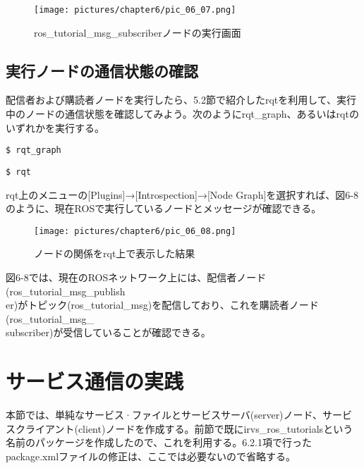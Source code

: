 \begin{figure}[h]
  \centering
  \texttt{[image: pictures/chapter6/pic\_06\_07.png]}
  \caption{ros\_tutorial\_msg\_subscriberノードの実行画面}
\end{figure}


\subsection{実行ノードの通信状態の確認}

配信者および購読者ノードを実行したら、5.2節で紹介したrqtを利用して、実行中のノードの通信状態を確認してみよう。次のようにrqt\_graph、あるいはrqtのいずれかを実行する。

\begin{lstlisting}[language=ROS]
$ rqt_graph
\end{lstlisting}

\begin{lstlisting}[language=ROS]
$ rqt
\end{lstlisting}

rqt上のメニューの[Plugins]→[Introspection]→[Node Graph]を選択すれば、図6-8のように、現在ROSで実行しているノードとメッセージが確認できる。

\begin{figure}[h]
  \centering
  \texttt{[image: pictures/chapter6/pic\_06\_08.png]}
  \caption{ノードの関係をrqt上で表示した結果}
\end{figure}

図6-8では、現在のROSネットワーク上には、配信者ノード(ros\_tutorial\_msg\_publish\\er)がトピック(ros\_tutorial\_msg)を配信しており、これを購読者ノード(ros\_tutorial\_msg\_\\subscriber)が受信していることが確認できる。

\section{サービス通信の実践}

本節では、単純なサービス·ファイルとサービスサーバ(server)ノード、サービスクライアント(client)ノードを作成する。前節で既にirvs\_ros\_tutorialsという名前のパッケージを作成したので、これを利用する。6.2.1項で行ったpackage.xmlファイルの修正は、ここでは必要ないので省略する。

